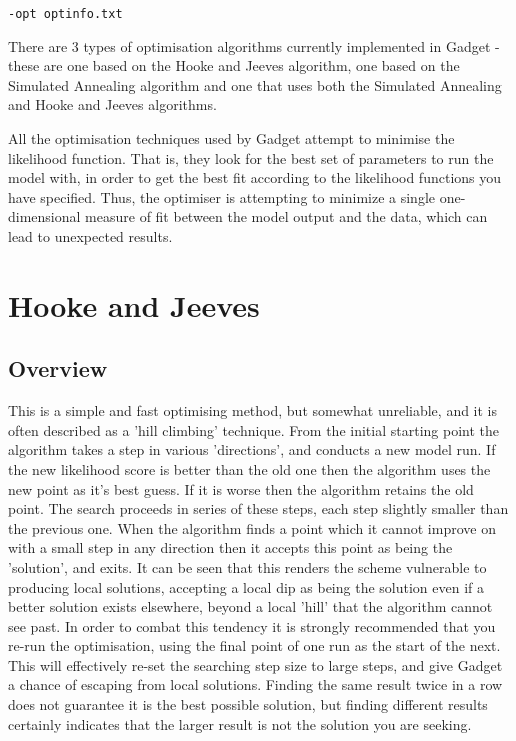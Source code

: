 \documentclass [a4paper, 10pt]{book}
\begin{document}
{\small\begin{verbatim}
-opt optinfo.txt
\end{verbatim}}

There are 3 types of optimisation algorithms currently implemented in Gadget - these are one based on the Hooke and Jeeves algorithm, one based on the Simulated Annealing algorithm and one that uses both the Simulated Annealing and Hooke and Jeeves algorithms.

\bigskip
All the optimisation techniques used by Gadget attempt to minimise the likelihood function. That is, they look for the best set of parameters to run the model with, in order to get the best fit according to the likelihood functions you have specified.  Thus, the optimiser is attempting to minimize a single one-dimensional measure of fit between the model output and the data, which can lead to unexpected results.

\section{Hooke and Jeeves}\label{sec:hooke}
\subsection{Overview}
This is a simple and fast optimising method, but somewhat unreliable, and it is often described as a 'hill climbing' technique.  From the initial starting point the algorithm takes a step in various 'directions', and conducts a new model run.  If the new likelihood score is better than the old one then the algorithm uses the new point as it's best guess.  If it is worse then the algorithm retains the old point. The search proceeds in series of these steps, each step slightly smaller than the previous one.  When the algorithm finds a point which it cannot improve on with a small step in any direction then it accepts this point as being the 'solution', and exits.  It can be seen that this renders the scheme vulnerable to producing local solutions, accepting a local dip as being the solution even if a better solution exists elsewhere, beyond a local 'hill' that the algorithm cannot see past.  In order to combat this tendency it is strongly recommended that you re-run the optimisation, using the final point of one run as the start of the next.  This will effectively re-set the searching step size to large steps, and give Gadget a chance of escaping from local solutions.  Finding the same result twice in a row does not guarantee it is the best possible solution, but finding different results certainly indicates that the larger result is not the solution you are seeking.
\end{document}
